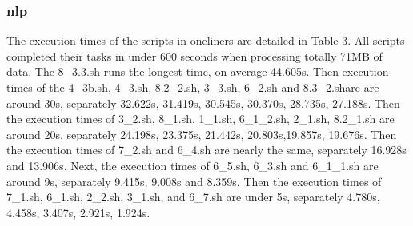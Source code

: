 \documentclass[sigplan, screen, 10pt]{acmart}
\begin{document}
\subsubsection{nlp}
The execution times of the scripts in oneliners are detailed in Table 3.
All scripts completed their tasks in under 600 seconds when processing totally 71MB of data.
The 8\_3.3.sh runs the longest time, on average 44.605s. Then execution times of  the 4\_3b.sh, 4\_3.sh, 8.2\_2.sh, 3\_3.sh, 6\_2.sh and 8.3\_2.share are around 30s, separately 32.622s, 31.419s, 30.545s, 30.370s,  28.735s, 27.188s.
Then the execution times of 3\_2.sh, 8\_1.sh, 1\_1.sh, 6\_1\_2.sh, 2\_1.sh, 8.2\_1.sh are around 20s, separately 24.198s, 23.375s, 21.442s, 20.803s,19.857s, 19.676s.
Then the execution times of 7\_2.sh and 6\_4.sh are nearly the same, separately 16.928s and 13.906s. Next, the execution times of 6\_5.sh, 6\_3.sh and 6\_1\_1.sh are around 9s, separately 9.415s,  9.008s and 8.359s. 
Then the execution times of 7\_1.sh, 6\_1.sh, 2\_2.sh, 3\_1.sh, and 6\_7.sh are under 5s, separately 4.780s, 4.458s,  3.407s, 2.921s, 1.924s.
\end{document}
